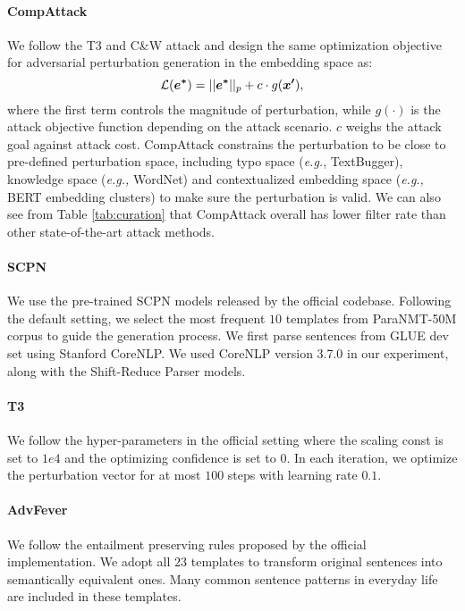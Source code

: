 \documentclass{article}
\begin{document}
\paragraph{CompAttack} We follow the T3 \citep{t3} and C\&W attack \citep{Carlini2018AudioAE} and design the same optimization objective for adversarial perturbation generation in the embedding space as:
\begin{equation}\small
    \mathcal{L}(\boldsymbol{e^*})  =  ||\boldsymbol{e^*}||_p + c \cdot g(\boldsymbol{x'}),
    \label{cw}
\end{equation}
where the first term controls the magnitude of perturbation, while $g(\cdot)$ is the attack objective function depending on the attack scenario. $c$ weighs the attack goal against attack cost. CompAttack constrains the perturbation to be close to pre-defined perturbation space, including typo space (\textit{e.g.}, TextBugger), knowledge space (\textit{e.g.,} WordNet) and contextualized embedding space (\textit{e.g., } BERT embedding clusters) to make sure the perturbation is valid. We can also see from Table \ref{tab:curation} that CompAttack overall has lower filter rate than other state-of-the-art attack methods.


\paragraph{SCPN}
We use the pre-trained SCPN models released by the official codebase. Following the default setting, we select the most frequent $10$ templates from ParaNMT-50M corpus \cite{wieting2017paranmt} to guide the generation process. We first parse sentences from GLUE dev set using Stanford CoreNLP. We used CoreNLP version 3.7.0 in our experiment, along with the Shift-Reduce Parser models.

\paragraph{T3}
We follow the hyper-parameters in the official setting where the scaling const is set to $1e4$ and the optimizing confidence is set to $0$. In each iteration, we optimize the perturbation vector for at most $100$ steps with learning rate $0.1$.

\paragraph{AdvFever}
We follow the entailment preserving rules proposed by the official implementation. We adopt all $23$ templates to transform original sentences into semantically equivalent ones. Many common sentence patterns in everyday life are included in these templates.
\end{document}
